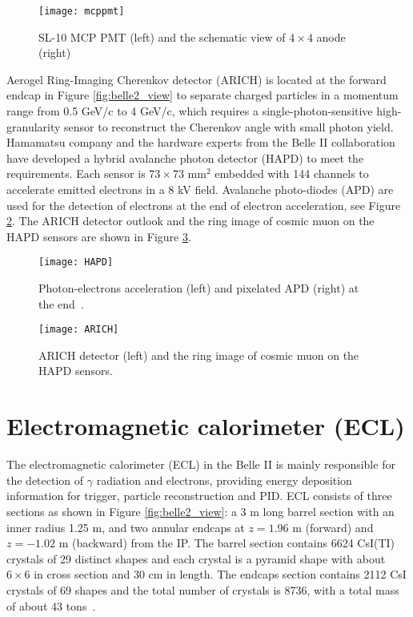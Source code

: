 \begin{figure}[htpb]
	\centering
	\texttt{[image: mcppmt]}
	\caption{SL-10 MCP PMT (left) and the schematic view of $4\times 4$ anode (right)~\cite{Abe:2010gxa}}
	\label{fig:mcppmt}
\end{figure}

Aerogel Ring-Imaging Cherenkov
detector (ARICH) is located at the forward endcap in Figure \ref{fig:belle2_view} to separate charged particles in a momentum range from 0.5 GeV/c to 4 GeV/c, which requires a single-photon-sensitive high-granularity sensor to reconstruct the Cherenkov angle with small photon yield.  
Hamamatsu company and the hardware experts from the Belle II collaboration have developed a hybrid avalanche photon detector (HAPD) to meet the requirements. Each sensor is $73 \times 73$ mm$^2$ embedded with 144 channels to accelerate emitted electrons in a 8 kV field. Avalanche photo-diodes (APD) are used for the detection of electrons at the end of electron acceleration, see Figure \ref{fig:arich_img}. The ARICH detector outlook and the ring image of cosmic muon on the HAPD sensors are shown in Figure \ref{fig:HAPD}.

\begin{figure}[htpb]
	\centering
	\texttt{[image: HAPD]}
	\caption{Photon-electrons acceleration (left) and pixelated APD (right) at the end~\cite{Abe:2010gxa}.}
	\label{fig:arich_img}
\end{figure}



\begin{figure}[htpb]
	\centering
	\texttt{[image: ARICH]}
	\caption{ARICH detector (left) and the ring image of cosmic muon on the HAPD sensors\cite{b2book}.}
	\label{fig:HAPD}
\end{figure}

\section{Electromagnetic calorimeter (ECL)}
The electromagnetic calorimeter (ECL) in the Belle II is mainly responsible for the detection of $\gamma$ radiation and electrons, providing energy deposition information for trigger, particle reconstruction and PID. ECL consists of three sections as shown in Figure \ref{fig:belle2_view}: a 3 m long barrel section with an inner radius 1.25 m, and two annular endcaps at $z = 1.96$ m (forward) and $z = -1.02$ m (backward) from the IP. The barrel section contains 6624 CsI(TI) crystals of 29 distinct shapes and each crystal is a pyramid shape with about $6\times 6$ in cross section and 30 cm in length. The endcaps section contains 2112 CsI crystals of 69 shapes and the total number of crystals is 8736, with a total
mass of about 43 tons~\cite{Abe:2010gxa}.


